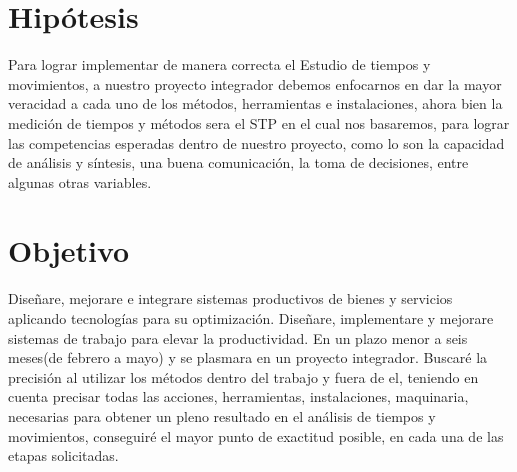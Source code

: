     \section{Hipótesis}
    
    Para lograr implementar de manera correcta el Estudio de tiempos y movimientos, a nuestro proyecto integrador debemos enfocarnos en dar la mayor veracidad a cada uno de los métodos, herramientas e instalaciones, ahora bien la medición de tiempos y métodos sera el STP en el cual nos basaremos, para lograr las competencias esperadas dentro de nuestro proyecto, como lo son la capacidad de análisis y síntesis, una buena comunicación, la toma de decisiones, entre algunas otras variables.
    
    \section{Objetivo}
    Diseñare, mejorare e integrare sistemas productivos de bienes y servicios aplicando tecnologías para su optimización.
    Diseñare, implementare y mejorare sistemas de trabajo para elevar la productividad.
    En un plazo menor a seis meses(de febrero a mayo) y se plasmara en un proyecto integrador.
    Buscaré la precisión al utilizar los métodos dentro del trabajo y fuera de el, teniendo en cuenta precisar todas las acciones, herramientas, instalaciones, maquinaria, necesarias para obtener un pleno resultado en el análisis de tiempos y movimientos, conseguiré el mayor punto de exactitud posible, en cada una de las etapas solicitadas. 
    
